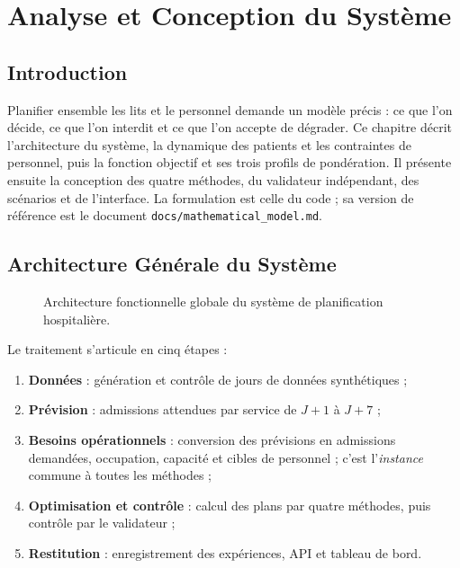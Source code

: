 \chapter{Analyse et Conception du Système}
\label{ch:conception_systeme}

\section*{Introduction}
Planifier ensemble les lits et le personnel demande un modèle précis : ce que l'on décide, ce que l'on interdit et ce que l'on accepte de dégrader. Ce chapitre décrit l'architecture du système, la dynamique des patients et les contraintes de personnel, puis la fonction objectif et ses trois profils de pondération. Il présente ensuite la conception des quatre méthodes, du validateur indépendant, des scénarios et de l'interface. La formulation est celle du code ; sa version de référence est le document \texttt{docs/mathematical\_model.md}.

\section{Architecture Générale du Système}

\begin{figure}[H]
    \centering
    \caption{Architecture fonctionnelle globale du système de planification hospitalière.}
    \label{fig:global_architecture}
\end{figure}

Le traitement s'articule en cinq étapes :
\begin{enumerate}
    \item \textbf{Données} : génération et contrôle de \NbJours{} jours de données synthétiques ;
    \item \textbf{Prévision} : admissions attendues par service de $J+1$ à $J+7$ ;
    \item \textbf{Besoins opérationnels} : conversion des prévisions en admissions demandées, occupation, capacité et cibles de personnel ; c'est l'\emph{instance} commune à toutes les méthodes ;
    \item \textbf{Optimisation et contrôle} : calcul des plans par quatre méthodes, puis contrôle par le validateur ;
    \item \textbf{Restitution} : enregistrement des expériences, API et tableau de bord.
\end{enumerate}

